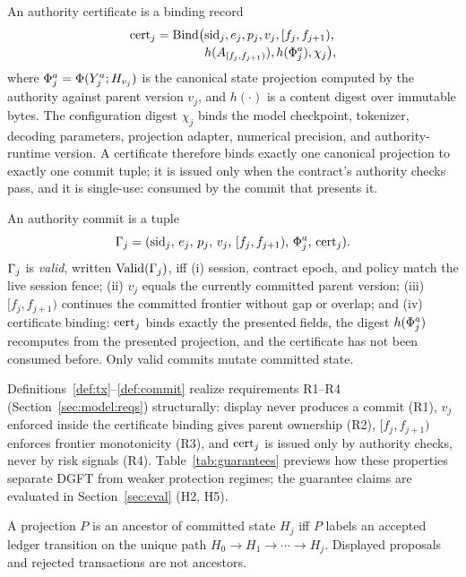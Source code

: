 \begin{definition}[Certificate]\label{def:cert}
An authority certificate is a binding record
\[
\begin{aligned}
  \mathrm{cert}_j = \mathrm{Bind}\bigl(&\mathrm{sid}_j,e_j,p_j,v_j,
  [f_j,f_{j+1}),\\[-2pt]
  &h(A_{[f_j,f_{j+1})}),h(\Phi_j^{a}),\chi_j\bigr),
\end{aligned}
\]
where $\Phi_j^{a} = \Phi(Y_j^{a};H_{v_j})$ is the canonical state
projection computed by the authority against parent version $v_j$, and
$h(\cdot)$ is a content digest over immutable bytes. The configuration
digest $\chi_j$ binds the model checkpoint, tokenizer, decoding parameters,
projection adapter, numerical precision, and authority-runtime version. A
certificate therefore binds
exactly one canonical projection to exactly one commit tuple; it is issued
only when the contract's authority checks pass, and it is single-use:
consumed by the commit that presents it.
\end{definition}

\begin{definition}\label{def:commit}
An authority commit is a tuple
\[
  \Gamma_j = (\mathrm{sid}_j,\, e_j,\, p_j,\, v_j,\, [f_j,f_{j+1}),\,
  \Phi_j^{a},\, \mathrm{cert}_j).
\]
$\Gamma_j$ is \emph{valid}, written $\mathrm{Valid}(\Gamma_j)$, iff
(i) session, contract epoch, and policy match the live session fence;
(ii) $v_j$ equals the currently committed parent version;
(iii) $[f_j,f_{j+1})$ continues the committed frontier without gap or
overlap; and
(iv) certificate binding: $\mathrm{cert}_j$ binds exactly the presented fields, the
digest $h(\Phi_j^{a})$ recomputes from the presented projection, and the
certificate has not been consumed before. Only valid commits mutate
committed state.
\end{definition}

Definitions~\ref{def:tx}--\ref{def:commit} realize requirements
R1--R4 (Section~\ref{sec:model:reqs}) structurally: display never produces
a commit (R1), $v_j$ enforced inside the certificate binding gives parent
ownership (R2), $[f_j,f_{j+1})$ enforces frontier monotonicity (R3), and
$\mathrm{cert}_j$ is issued only by authority checks, never by risk signals (R4).
Table~\ref{tab:guarantees} previews how these properties separate DGFT from
weaker protection regimes; the guarantee claims are evaluated in
Section~\ref{sec:eval} (H2, H5).


\begin{definition}\label{def:ancestry}
A projection $P$ is an ancestor of committed state $H_j$ iff $P$ labels an
accepted ledger transition on the unique path
$H_0\rightarrow H_1\rightarrow\cdots\rightarrow H_j$. Displayed proposals
and rejected transactions are not ancestors.
\end{definition}

